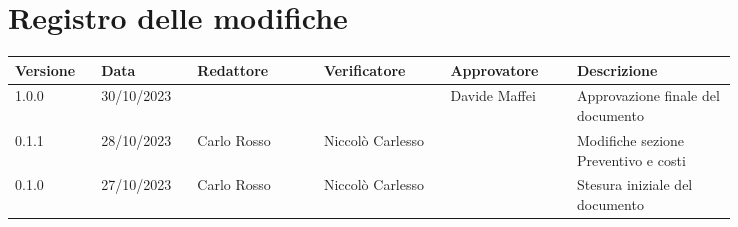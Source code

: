 
\section*{Registro delle modifiche}
{
\renewcommand{\arraystretch}{1.5}
\scriptsize
\begin{tabular}{p{0.10\linewidth}p{0.10\linewidth}p{0.15\linewidth}p{0.15\linewidth}p{0.15\linewidth}p{0.19\linewidth}}
    \textbf{Versione}  & \textbf{Data}  & \textbf{Redattore}    & \textbf{Verificatore} & \textbf{Approvatore}  & \textbf{Descrizione}  \\
    \hline
	1.0.0 & 30/10/2023 &                &                  & Davide Maffei & Approvazione finale del documento     \\
    \hline
    0.1.1 & 28/10/2023 & Carlo Rosso    & Niccolò Carlesso &               & Modifiche sezione Preventivo e costi  \\
    \hline
	0.1.0 & 27/10/2023 & Carlo Rosso    & Niccolò Carlesso &               & Stesura iniziale del documento        \\
    \hline
\end{tabular}
}

